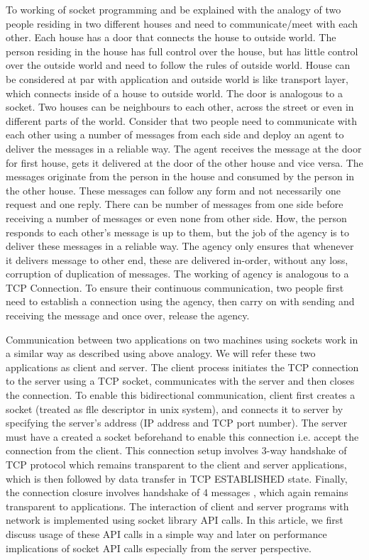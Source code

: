 \begin{multicols}{2}
To working of socket programming and be explained with the analogy of two people \cite{art1-key03} residing in two different houses and need to communicate/meet with each other. Each house has a door that connects the house to outside world. The person residing in the house has full control over the house, but has little control over the outside world and need to follow the rules of outside world. House can be considered at par with application and outside world is like transport layer, which connects inside of a house to outside world. The door is analogous to a socket. Two houses can be neighbours to each other, across the street or even in different parts of the world. Consider that two people need to communicate with each other using a number of messages from each side and deploy an agent to deliver the messages in a reliable way. The agent receives the message at the door for first house, gets it delivered at the door of the other house and vice versa. The messages originate from the person in the house and consumed by the person in the other house.  These messages can follow any form and not necessarily one request and one reply. There can be number of messages from one side before receiving a number of messages or even none from other side. How, the person responds to each other’s message is up to them, but the job of the agency is to deliver these messages in a reliable way. The agency only ensures that whenever it delivers message to other end, these are delivered in-order, without any loss, corruption of duplication of messages. The working of agency is analogous to a TCP Connection. To ensure their continuous communication, two people first need to establish a connection using the agency, then carry on with sending and receiving the message and once over, release the agency.

Communication between two applications on two machines using sockets work in a similar way as described using above analogy. We will refer these two applications as client and server. The client process initiates the TCP connection to the server using a TCP socket, communicates with the server and then closes the connection. To enable this bidirectional communication, client first creates a socket (treated as flle descriptor in unix system), and connects it to server by specifying the server’s address (IP address and TCP port number). The server must have a created a socket beforehand to enable this connection i.e. accept the connection from the client. This connection setup involves 3-way handshake of TCP \cite{art1-key03}\cite{art1-key04}\cite{art1-key05} protocol which remains transparent to the client and server applications, which is then followed by data transfer in TCP ESTABLISHED state\cite{art1-key05}.  Finally, the connection closure involves handshake of 4 messages \cite{art1-key06}, which again remains transparent to applications. The interaction of client and server programs with network is implemented using socket library API calls. In this article, we first discuss usage of these API calls in a simple way and later on performance implications of socket API calls especially from the server perspective. 


\end{multicols}
